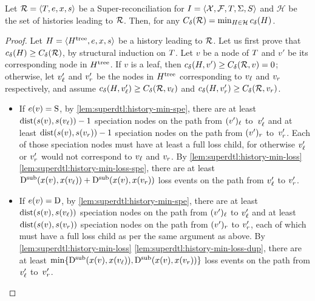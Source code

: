 \begin{lemma}\label{lem:superdtl:superrec-min-hist}
    Let \(\mathcal{R} = \left\langle T, e, x, s\right\rangle\) be a Super-reconciliation for \(I = \left\langle\mathcal{X}, \mathcal{F}, T, \Sigma, S\right\rangle\) and \(\mathcal{H}\) be the set of histories leading to \(\mathcal{R}\). Then, for any \(C_{\delta\kern.1pt}(\mathcal{R}) = \min_{H \in \mathcal{H}} c_\delta\kern.1pt(H)\).
\end{lemma}
\begin{proof}
    Let \(H = \left\langle H^\mathrm{tree}, e, x, s\right\rangle\) be a history leading to \(\mathcal{R}\).
    Let us first prove that \(c_\delta\kern.1pt(H) \geq C_{\delta\kern.1pt}(\mathcal{R})\), by structural induction on \(T\).
    Let \(v\) be a node of \(T\) and \(v'\) be its corresponding node in \(H^\mathrm{tree}\).
    If \(v\) is a leaf, then \(c_\delta\kern.1pt(H, v') \geq C_{\delta\kern.1pt}(\mathcal{R}, v) = 0\); otherwise, let \(v'_\mathit{\ell}\) and \(v'_r\) be the nodes in \(H^\mathrm{tree}\) corresponding to \(v_\mathit{\ell}\) and \(v_r\) respectively, and assume \(c_\delta\kern.1pt(H, v'_\mathit{\ell}) \geq C_{\delta\kern.1pt}(\mathcal{R}, v_\mathit{\ell})\) and \(c_\delta\kern.1pt(H, v'_r) \geq C_{\delta\kern.1pt}(\mathcal{R}, v_r)\).
    \begin{itemize}
        \item If \(e(v) = \mathrm{S}\), by \cref{lem:superdtl:history-min-spe}, there are at least \(\mathrm{dist}(s(v), s(v_\mathit{\ell})) - 1\) speciation nodes on the path from \((v')_\mathit{\ell}\) to~\(v'_\mathit{\ell}\) and at least \(\mathrm{dist}(s(v), s(v_r)) - 1\) speciation nodes on the path from \((v')_r\) to~\(v'_r\). Each of those speciation nodes must have at least a full loss child, for otherwise \(v'_\mathit{\ell}\) or \(v'_r\) would not correspond to \(v_\mathit{\ell}\) and \(v_r\).
        By \cref{lem:superdtl:history-min-loss} \cref{lem:superdtl:history-min-loss-spe}, there are at least \(\mathrm{D}^\mathrm{sub}(x(v), x(v_\mathit{\ell})) + \mathrm{D}^\mathrm{sub}(x(v), x(v_r))\) loss events on the path from \(v'_\mathit{\ell}\) to \(v'_r\).
        \item If \(e(v) = \mathrm{D}\), by \cref{lem:superdtl:history-min-spe}, there are at least \(\mathrm{dist}(s(v), s(v_\mathit{\ell}))\) speciation nodes on the path from \((v')_\mathit{\ell}\) to \(v'_\mathit{\ell}\) and at least \(\mathrm{dist}(s(v), s(v_r))\) speciation nodes on the path from \((v')_r\) to \(v'_r\), each of which must have a full loss child as per the same argument as above.
        By \cref{lem:superdtl:history-min-loss} \cref{lem:superdtl:history-min-loss-dup}, there are at least \(\min\{\mathrm{D}^\mathrm{sub}(x(v), x(v_\mathit{\ell})), \mathrm{D}^\mathrm{sub}(x(v), x(v_r))\}\) loss events on the path from \(v'_\mathit{\ell}\) to~\(v'_r\).

\end{itemize}
\end{proof}
